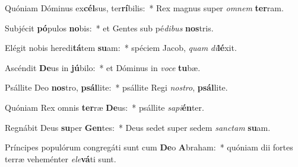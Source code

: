 \item Quóniam Dóminus ex\textbf{cél}sus, ter\textbf{rí}bilis:~* Rex magnus super \textit{om}\textit{nem} \textbf{ter}ram.
\item Subjécit \textbf{pó}pulos \textbf{no}bis:~* et Gentes sub pé\textit{di}\textit{bus} \textbf{nos}tris.
\item Elégit nobis heredi\textbf{tá}tem \textbf{su}am:~* spéciem Jacob, \textit{quam} \textit{di}\textbf{lé}xit.
\item Ascéndit \textbf{De}us in \textbf{jú}bilo:~* et Dóminus in \textit{vo}\textit{ce} \textbf{tu}bæ.
\item Psállite Deo \textbf{nos}tro, \textbf{psál}lite:~* psállite Regi \textit{nos}\textit{tro}, \textbf{psál}lite.
\item Quóniam Rex omnis \textbf{ter}ræ \textbf{De}us:~* psállite \textit{sa}\textit{pi}\textbf{én}ter.
\item Regnábit Deus \textbf{su}per \textbf{Gen}tes:~* Deus sedet super sedem \textit{sanc}\textit{tam} \textbf{su}am.
\item Príncipes populórum congregáti sunt cum \textbf{De}o \textbf{A}braham:~* quóniam dii fortes terræ veheménter \textit{e}\textit{le}\textbf{vá}ti sunt.
